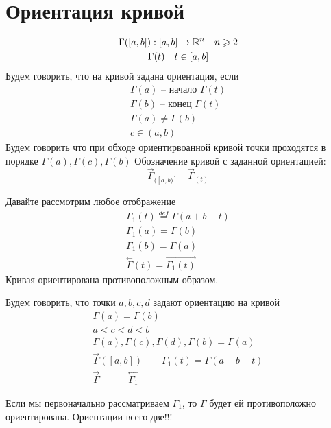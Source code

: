 \documentclass[main]{subfiles}
\begin{document}
\section{Ориентация кривой}
\begin{definition}
    \begin{gather*}
        \Gamma([a,b]): [a,b] \rightarrow {\mathbb{R}^n}  \quad n \geqslant 2\\
        \Gamma(t) \quad t \in [a,b] 
    \end{gather*}
    Будем говорить, что на кривой задана ориентация, если
    \begin{gather*}
        \Gamma(a) \text { -- начало } \Gamma(t) \\
        \Gamma(b) \text { -- конец } \Gamma(t) \\
        \Gamma(a) \ne \Gamma(b) \\
        c \in (a,b)
    \end{gather*}
        Будем говорить что при обходе ориентирвоанной кривой точки проходятся в порядке $ \Gamma(a), \Gamma(c), \Gamma(b) $
    Обозначение кривой с заданной ориентацией:
    \[ \stackrel{\rightarrow}{\Gamma}_{([a,b)]} \quad \stackrel{\rightarrow}{\Gamma}_{(t)} \]
\end{definition}
\begin{definition}
    Давайте рассмотрим любое отображение 
\begin{gather*}
    \Gamma_1(t) \stackrel{def}{=} \Gamma(a+b-t) \\
    \Gamma_1(a) = \Gamma(b) \\
    \Gamma_1(b) = \Gamma(a) \\
    \stackrel{\leftarrow}{\Gamma} (t) = \stackrel{\rightarrow}{\Gamma_1(t)} 
\end{gather*}
Кривая ориентирована противоположным образом.
\end{definition}

\begin{definition}
    Будем говорить, что точки $a,b,c,d$ задают ориентацию на кривой
    \begin{gather*}
        \Gamma(a) = \Gamma(b) \\
        a < c < d < b \\
        \Gamma(a), \Gamma(c), \Gamma(d), \Gamma(b) = \Gamma(a)\\
        \stackrel{\rightarrow}{\Gamma}([a,b]) \quad \quad \Gamma_1(t) = \Gamma(a+b-t)\\
        \stackrel{\rightarrow}{\Gamma} \quad \quad \quad \stackrel{\leftarrow}{\Gamma_1}
    \end{gather*}
\end{definition}
Если мы первоначально рассматриваем $\Gamma_1$, то $\Gamma$ будет ей противоположно ориентирована.
Ориентации всего две!!! 
\end{document}
